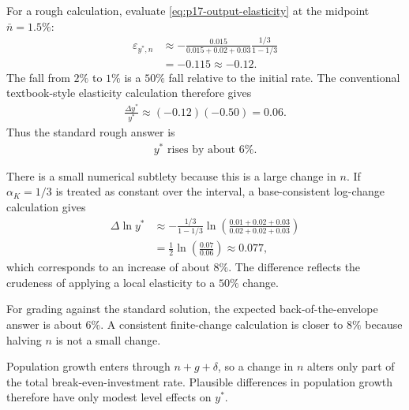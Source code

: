 \begin{solution}
For a rough calculation, evaluate \eqref{eq:p17-output-elasticity} at the midpoint
\(\bar n=1.5\%\):
\begin{align*}
    \varepsilon_{y^*,n}
    &\approx
    -\frac{0.015}{0.015+0.02+0.03}
    \frac{1/3}{1-1/3}\\
    &=-0.115\approx-0.12.
\end{align*}
The fall from \(2\%\) to \(1\%\) is a \(50\%\) fall relative to the initial
rate. The conventional textbook-style elasticity calculation therefore gives
\begin{align*}
    \frac{\Delta y^*}{y^*}
    \approx(-0.12)(-0.50)=0.06.
\end{align*}
Thus the standard rough answer is
\begin{align*}
    \boxed{y^*\text{ rises by about }6\%.}
\end{align*}

There is a small numerical subtlety because this is a large change in \(n\).
If \(\alpha_K=1/3\) is treated as constant over the interval, a
base-consistent log-change calculation gives
\begin{align*}
    \Delta\ln y^*
    &\approx-\frac{1/3}{1-1/3}
    \ln\!\left(
    \frac{0.01+0.02+0.03}{0.02+0.02+0.03}
    \right)\\
    &=\frac{1}{2}\ln\!\left(\frac{0.07}{0.06}\right)
    \approx0.077,
\end{align*}
which corresponds to an increase of about \(8\%\). The difference reflects
the crudeness of applying a local elasticity to a \(50\%\) change.
\end{solution}

\begin{note}
    For grading against the standard solution, the expected back-of-the-envelope
    answer is about \(6\%\). A consistent finite-change calculation is closer to
    \(8\%\) because halving \(n\) is not a small change.
\end{note}

\begin{note}
    Population growth enters through \(n+g+\delta\), so a change in \(n\) alters only
    part of the total break-even-investment rate. Plausible differences in population
    growth therefore have only modest level effects on \(y^*\).
\end{note}

